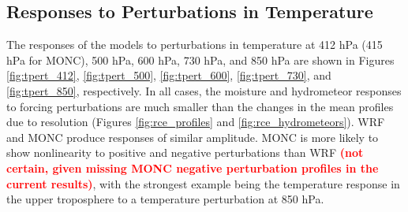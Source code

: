 \documentclass[draft]{agujournal2019}
\newcommand{\todo}[1]{\textcolor{red}{\textbf{(#1)}}}
\begin{document}
\subsection{Responses to Perturbations in Temperature}

The responses of the models to perturbations in temperature at 412 hPa (415 hPa
for MONC), 500 hPa, 600 hPa, 730 hPa, and 850 hPa are shown in Figures
\ref{fig:tpert_412}, \ref{fig:tpert_500}, \ref{fig:tpert_600},
\ref{fig:tpert_730}, and \ref{fig:tpert_850}, respectively. In all cases, the
moisture and hydrometeor responses to forcing perturbations are much smaller
than the changes in the mean profiles due to resolution (Figures
\ref{fig:rce_profiles} and \ref{fig:rce_hydrometeors}). WRF and MONC produce
responses of similar amplitude. MONC is more likely to show nonlinearity to
positive and negative perturbations than WRF \todo{not certain, given missing
MONC negative perturbation profiles in the current results}, with the strongest
example being the temperature response in the upper troposphere to a temperature
perturbation at 850 hPa. 


\end{document}
